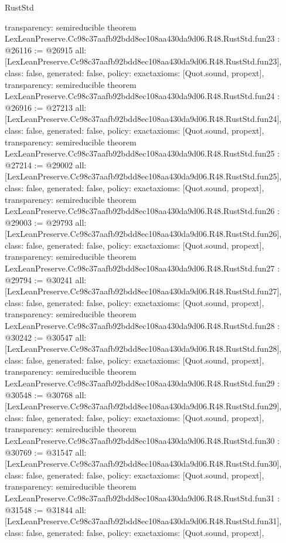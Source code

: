 \begin{lexlean}{RustStd}
\begin{coremodule}
{  transparency: semireducible
}
theorem LexLeanPreserve.Cc98c37aafb92bdd8ec108aa430da9d06.R48.RustStd.fun23 : @26116 := @26915 {
  all: [LexLeanPreserve.Cc98c37aafb92bdd8ec108aa430da9d06.R48.RustStd.fun23],
  class: false,
  generated: false,
  policy: exact{axioms: [Quot.sound, propext]},
  transparency: semireducible
}
theorem LexLeanPreserve.Cc98c37aafb92bdd8ec108aa430da9d06.R48.RustStd.fun24 : @26916 := @27213 {
  all: [LexLeanPreserve.Cc98c37aafb92bdd8ec108aa430da9d06.R48.RustStd.fun24],
  class: false,
  generated: false,
  policy: exact{axioms: [Quot.sound, propext]},
  transparency: semireducible
}
theorem LexLeanPreserve.Cc98c37aafb92bdd8ec108aa430da9d06.R48.RustStd.fun25 : @27214 := @29002 {
  all: [LexLeanPreserve.Cc98c37aafb92bdd8ec108aa430da9d06.R48.RustStd.fun25],
  class: false,
  generated: false,
  policy: exact{axioms: [Quot.sound, propext]},
  transparency: semireducible
}
theorem LexLeanPreserve.Cc98c37aafb92bdd8ec108aa430da9d06.R48.RustStd.fun26 : @29003 := @29793 {
  all: [LexLeanPreserve.Cc98c37aafb92bdd8ec108aa430da9d06.R48.RustStd.fun26],
  class: false,
  generated: false,
  policy: exact{axioms: [Quot.sound, propext]},
  transparency: semireducible
}
theorem LexLeanPreserve.Cc98c37aafb92bdd8ec108aa430da9d06.R48.RustStd.fun27 : @29794 := @30241 {
  all: [LexLeanPreserve.Cc98c37aafb92bdd8ec108aa430da9d06.R48.RustStd.fun27],
  class: false,
  generated: false,
  policy: exact{axioms: [Quot.sound, propext]},
  transparency: semireducible
}
theorem LexLeanPreserve.Cc98c37aafb92bdd8ec108aa430da9d06.R48.RustStd.fun28 : @30242 := @30547 {
  all: [LexLeanPreserve.Cc98c37aafb92bdd8ec108aa430da9d06.R48.RustStd.fun28],
  class: false,
  generated: false,
  policy: exact{axioms: [Quot.sound, propext]},
  transparency: semireducible
}
theorem LexLeanPreserve.Cc98c37aafb92bdd8ec108aa430da9d06.R48.RustStd.fun29 : @30548 := @30768 {
  all: [LexLeanPreserve.Cc98c37aafb92bdd8ec108aa430da9d06.R48.RustStd.fun29],
  class: false,
  generated: false,
  policy: exact{axioms: [Quot.sound, propext]},
  transparency: semireducible
}
theorem LexLeanPreserve.Cc98c37aafb92bdd8ec108aa430da9d06.R48.RustStd.fun30 : @30769 := @31547 {
  all: [LexLeanPreserve.Cc98c37aafb92bdd8ec108aa430da9d06.R48.RustStd.fun30],
  class: false,
  generated: false,
  policy: exact{axioms: [Quot.sound, propext]},
  transparency: semireducible
}
theorem LexLeanPreserve.Cc98c37aafb92bdd8ec108aa430da9d06.R48.RustStd.fun31 : @31548 := @31844 {
  all: [LexLeanPreserve.Cc98c37aafb92bdd8ec108aa430da9d06.R48.RustStd.fun31],
  class: false,
  generated: false,
  policy: exact{axioms: [Quot.sound, propext]},
}
\end{coremodule}
\end{lexlean}
